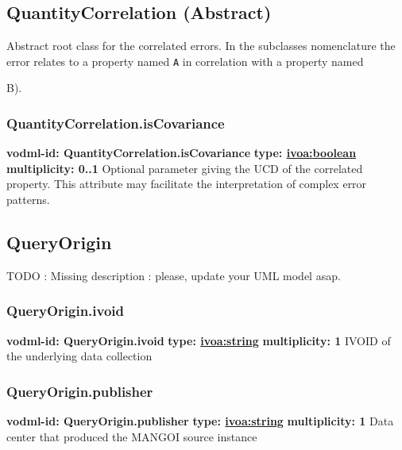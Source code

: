   \subsection{QuantityCorrelation (Abstract)}
  \label{sect:QuantityCorrelation}
    Abstract root class for the correlated errors. In the subclasses nomenclature the error relates to a property named \texttt{A} in correlation with a property named {B).

    \subsubsection{QuantityCorrelation.isCovariance}
      \textbf{vodml-id: QuantityCorrelation.isCovariance} \newline
      \textbf{type: \hyperref[sect:ivoa]{ivoa:boolean}} \newline
      \textbf{multiplicity: 0..1} \newline 
      Optional parameter giving the UCD of the correlated property. This attribute may facilitate the interpretation of complex error patterns.

  \subsection{QueryOrigin}
  \label{sect:QueryOrigin}
    TODO : Missing description : please, update your UML model asap.

    \subsubsection{QueryOrigin.ivoid}
      \textbf{vodml-id: QueryOrigin.ivoid} \newline
      \textbf{type: \hyperref[sect:ivoa]{ivoa:string}} \newline
      \textbf{multiplicity: 1} \newline 
      IVOID of the underlying data collection

    \subsubsection{QueryOrigin.publisher}
      \textbf{vodml-id: QueryOrigin.publisher} \newline
      \textbf{type: \hyperref[sect:ivoa]{ivoa:string}} \newline
      \textbf{multiplicity: 1} \newline 
      Data center that produced the MANGOI source instance

}
